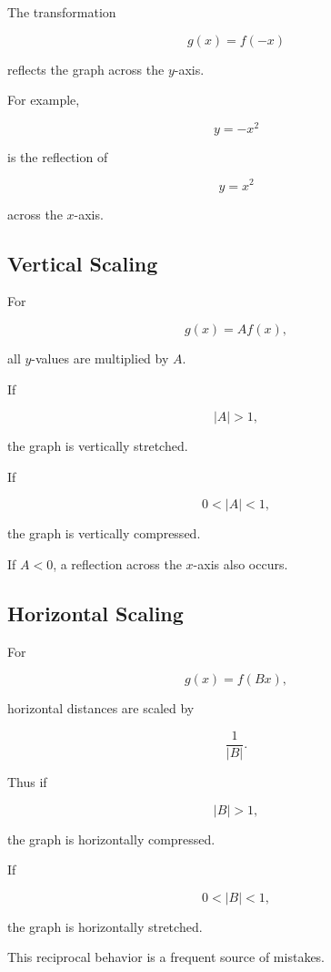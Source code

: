 The transformation

\[ g(x)=f(-x) \]

reflects the graph across the \(y\)-axis.

For example,

\[ y=-x^2 \]

is the reflection of

\[ y=x^2 \]

across the \(x\)-axis.

\subsection{Vertical Scaling}
\label{subsec:vertical-scaling}

For

\[ g(x)=Af(x), \]

all \(y\)-values are multiplied by \(A\).

If

\[ |A|>1, \]

the graph is vertically stretched.

If

\[ 0<|A|<1, \]

the graph is vertically compressed.

If \(A<0\), a reflection across the \(x\)-axis also occurs.

\subsection{Horizontal Scaling}
\label{subsec:horizontal-scaling}

For

\[ g(x)=f(Bx), \]

horizontal distances are scaled by

\[ \frac{1}{|B|}. \]

Thus if

\[ |B|>1, \]

the graph is horizontally compressed.

If

\[ 0<|B|<1, \]

the graph is horizontally stretched.

This reciprocal behavior is a frequent source of mistakes.

